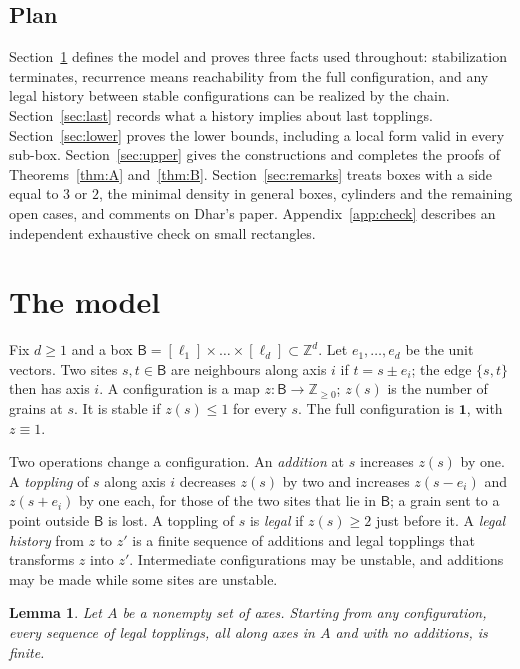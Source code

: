 \documentclass[11pt]{amsart}
\newtheorem{lemma}[theorem]{Lemma}
\theoremstyle{definition}
\newcommand{\ZZ}{\mathbb{Z}}
\newcommand{\one}{\mathbf 1}
\newcommand{\B}{\mathsf B}
\begin{document}
\subsection*{Plan}
Section~\ref{sec:model} defines the model and proves three facts used throughout: stabilization terminates, recurrence means reachability from the full configuration, and any legal history between stable configurations can be realized by the chain. Section~\ref{sec:last} records what a history implies about last topplings. Section~\ref{sec:lower} proves the lower bounds, including a local form valid in every sub-box. Section~\ref{sec:upper} gives the constructions and completes the proofs of Theorems~\ref{thm:A} and~\ref{thm:B}. Section~\ref{sec:remarks} treats boxes with a side equal to $3$ or $2$, the minimal density in general boxes, cylinders and the remaining open cases, and comments on Dhar's paper. Appendix~\ref{app:check} describes an independent exhaustive check on small rectangles.

\section{The model}\label{sec:model}

Fix $d\ge1$ and a box $\B=[\ell_1]\times\dots\times[\ell_d]\subset\ZZ^d$. Let $e_1,\dots,e_d$ be the unit vectors. Two sites $s,t\in\B$ are neighbours along axis $i$ if $t=s\pm e_i$; the edge $\{s,t\}$ then has axis $i$. A configuration is a map $z\colon\B\to\ZZ_{\ge0}$; $z(s)$ is the number of grains at $s$. It is stable if $z(s)\le1$ for every $s$. The full configuration is $\one$, with $z\equiv1$.

Two operations change a configuration. An \emph{addition} at $s$ increases $z(s)$ by one. A \emph{toppling} of $s$ along axis $i$ decreases $z(s)$ by two and increases $z(s-e_i)$ and $z(s+e_i)$ by one each, for those of the two sites that lie in $\B$; a grain sent to a point outside $\B$ is lost. A toppling of $s$ is \emph{legal} if $z(s)\ge2$ just before it. A \emph{legal history} from $z$ to $z'$ is a finite sequence of additions and legal topplings that transforms $z$ into $z'$. Intermediate configurations may be unstable, and additions may be made while some sites are unstable.

\begin{lemma}\label{lem:finite}
Let $A$ be a nonempty set of axes. Starting from any configuration, every sequence of legal topplings, all along axes in $A$ and with no additions, is finite.
\end{lemma}
\end{document}
